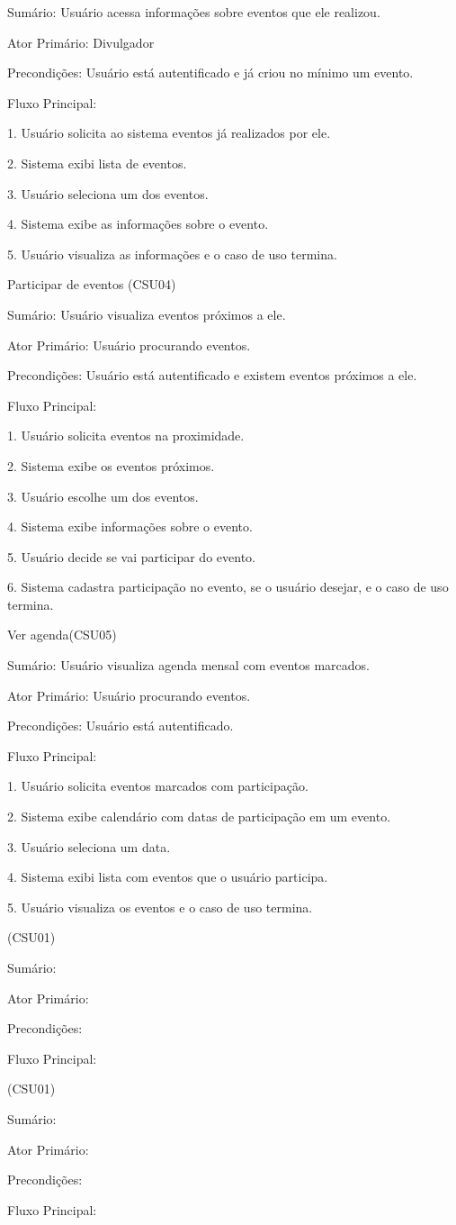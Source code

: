 \documentclass{article}
\begin{document}
	Sumário: Usuário acessa informações sobre eventos que ele realizou.
	
	Ator Primário: Divulgador
	
	Precondições: Usuário está autentificado e já criou no mínimo um evento.
	
	Fluxo Principal:
	
	1. Usuário solicita ao sistema eventos já realizados por ele.
	
	2. Sistema exibi lista de eventos.
	
	3. Usuário seleciona um dos eventos.
	
	4. Sistema exibe as informações sobre o evento.
	
	5. Usuário visualiza as informações e o caso de uso termina.\bigskip
	
	Participar de  eventos (CSU04)
	
	Sumário: Usuário visualiza eventos próximos a ele.
	
	Ator Primário: Usuário procurando eventos.
	
	Precondições: Usuário está autentificado e existem eventos próximos a ele.
	
	Fluxo Principal:
	
	1. Usuário solicita eventos na proximidade.
	
	2. Sistema exibe os eventos próximos.
	
	3. Usuário escolhe um dos eventos.
	
	4. Sistema exibe informações sobre o evento.
	
	5. Usuário decide se vai participar do evento.
	
	6. Sistema cadastra participação no evento, se o usuário desejar, e o caso de uso termina.\bigskip
	
	Ver agenda(CSU05)
	
	Sumário: Usuário visualiza agenda mensal com eventos marcados.
	
	Ator Primário: Usuário procurando eventos.
	
	Precondições: Usuário está autentificado.
	
	Fluxo Principal:
	
	1. Usuário solicita eventos marcados com participação.
	
	2. Sistema exibe calendário com datas de participação em um evento.
	
	3. Usuário seleciona um data.
	
	4. Sistema exibi lista com eventos que o usuário participa.
	
	5. Usuário visualiza os eventos e o caso de uso termina.
	
	 (CSU01)
	
	Sumário: 
	
	Ator Primário: 
	
	Precondições: 
	
	Fluxo Principal:
	
	 (CSU01)
	
	Sumário: 
	
	Ator Primário: 
	
	Precondições: 
	
	Fluxo Principal:
	
	
	
	 

	
	


\begin{easylist}[articletoc]
\end{easylist}
\end{document}
